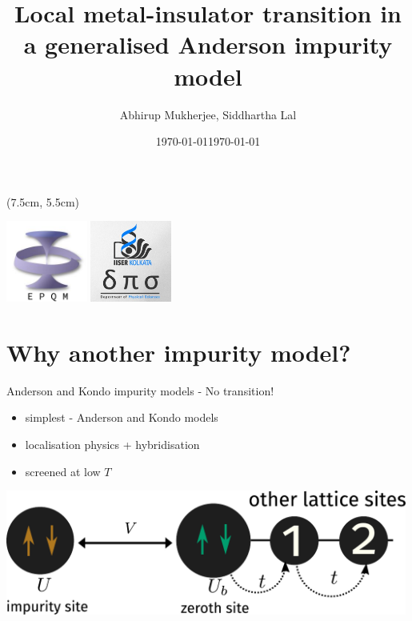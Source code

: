 \documentclass[aspectratio=169]{beamer}
\title{
{Local metal-insulator transition in a generalised Anderson impurity model}
}
\date{\today}
\author{\large Abhirup Mukherjee, Siddhartha Lal}
\institute{Department of Physical Sciences, IISER Kolkata, Mohanpur}
\date{\large\today}
\begin{document}
\begin{frame}[noframenumbering]
\maketitle
\begin{textblock*}{0.7\textwidth}(7.5cm, 5.5cm)
	\centering
	\vspace*{\fill}

	\hspace*{\fill}
	\includegraphics[width=0.2\textwidth]{figures/epqm_logo_mod.jpeg}
	\includegraphics[width=0.2\textwidth]{figures/dps_logo.jpeg}
	\hspace*{\fill}

	\vspace*{\fill}
\end{textblock*}
\end{frame}

\section{Why another impurity model?}

\begin{frame}[noframenumbering]{Anderson and Kondo impurity models - No transition!}

\hspace*{-20pt}
\begin{minipage}{0.53\textwidth}
\begin{itemize}
	\item simplest - Anderson and Kondo models\\[20pt]
	\item localisation physics + hybridisation\\[20pt]
	\item screened at low \(T\)\\[20pt]
\end{itemize}
\end{minipage}
\begin{minipage}{0.5\textwidth}
\includegraphics[width=0.99\textwidth]{figures/siam.pdf}
\end{minipage}
\end{frame}
\end{document}
